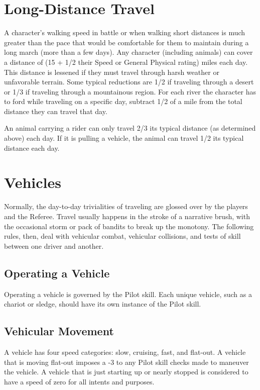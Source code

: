 \documentclass[oneside]{book}
\begin{document}
\begin{multicols}{2}
\section{Long-Distance Travel}
A character's walking speed in battle or when walking short distances is much greater than the pace that would be comfortable for them to maintain during a long march (more than a few days). Any character (including animals) can cover a distance of (15 + 1/2 their Speed or General Physical rating) miles each day. This distance is lessened if they must travel through harsh weather or unfavorable terrain. Some typical reductions are 1/2 if traveling through a desert or 1/3 if traveling through a mountainous region. For each river the character has to ford while traveling on a specific day, subtract 1/2 of a mile from the total distance they can travel that day.  

An animal carrying a rider can only travel 2/3 its typical distance (as determined above) each day. If it is pulling a vehicle, the animal can travel 1/2 its typical distance each day. 

\section{Vehicles}
Normally, the day-to-day trivialities of traveling are glossed over by the players and the Referee. Travel usually happens in the stroke of a narrative brush, with the occasional storm or pack of bandits to break up the monotony. The following rules, then, deal with vehicular combat, vehicular collisions, and tests of skill between one driver and another.

\subsection{Operating a Vehicle}
Operating a vehicle is governed by the Pilot skill. Each unique vehicle, such as a chariot or sledge, should have its own instance of the Pilot skill. 

\subsection{Vehicular Movement}
A vehicle has four speed categories: slow, cruising, fast, and flat-out. A vehicle that is moving flat-out imposes a -3 to any Pilot skill checks made to maneuver the vehicle. A vehicle that is just starting up or nearly stopped is considered to have a speed of zero for all intents and purposes. 


\end{multicols}
\end{document}
